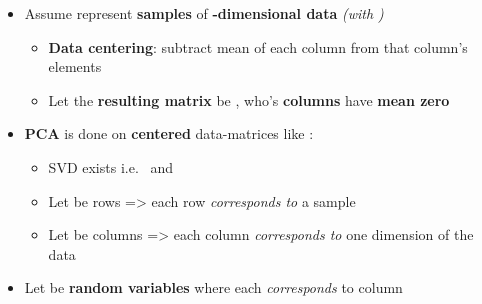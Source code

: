 \begin{itemize}

  \item
        Assume 
        represent \textbf{ samples} of \textbf{-dimensional
          data} \emph{(with )}

        \begin{itemize}

          \item
                \textbf{Data centering}: subtract mean of each column from that
                column's elements
          \item
                Let the \textbf{resulting matrix} be
                , who's \textbf{columns} have
                \textbf{mean zero}
        \end{itemize}
  \item
        \textbf{PCA} is done on \textbf{centered} data-matrices like
        :

        \begin{itemize}

          \item
                SVD exists i.e.~ and 
          \item
                Let  be rows
                =\textgreater{} each row \emph{corresponds to} a sample
          \item
                Let  be columns
                =\textgreater{} each column \emph{corresponds to} one dimension of
                the data
        \end{itemize}
  \item
        Let  be \textbf{random variables} where
        each  \emph{corresponds} to column 

        \begin{itemize}


\end{itemize}
\end{itemize}
